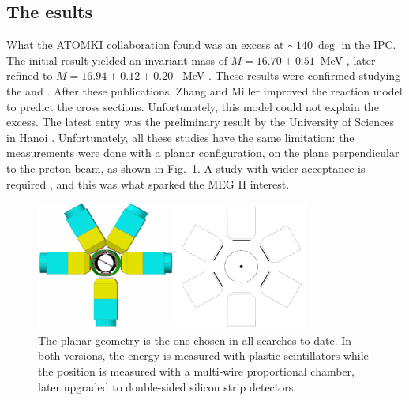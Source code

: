 \begin{refsection}
    \subsection{The esults}
        What the ATOMKI collaboration found was an excess at $\sim\SI{140}{\deg}$ in the IPC. 
        The initial result yielded an invariant mass of $M = 16.70\pm0.51$~MeV \cite{X17:Anomaly:2015}, later refined to $M=16.94\pm0.12\pm0.20$~ MeV \cite{X17:2023}.
        These results were confirmed studying the  and .
        After these publications, Zhang and Miller \cite{X17:Zhang:2017}\cite{X17:Zhang:2020}\cite{X17:Zahng:2021} improved the reaction model to predict the cross sections. 
        Unfortunately, this model could not explain the excess.
        The latest entry was the preliminary result by the  University of Sciences in Hanoi \cite{X17:Hanoi:2023}.
        Unfortunately, all these studies have the same limitation: the measurements were done with a planar configuration,  on the plane perpendicular to the proton beam, as shown in Fig.~\ref{fig:X17:ATOMKI}.
        A study with wider acceptance is required \cite{X17:2023}, and this was what sparked the MEG II interest.

        \begin{figure}
            \centering
            \includegraphics[width = 0.8\textwidth]{Figures/X17/Atomki_geometry.png}
            \caption[Planar geometry of X17 searches]{The planar geometry is the one chosen in all searches to date. In both versions, the energy is measured with plastic scintillators while the position is measured with a multi-wire proportional chamber, later upgraded to double-sided silicon strip detectors.}
            \label{fig:X17:ATOMKI}
        \end{figure}
        

\end{refsection}

